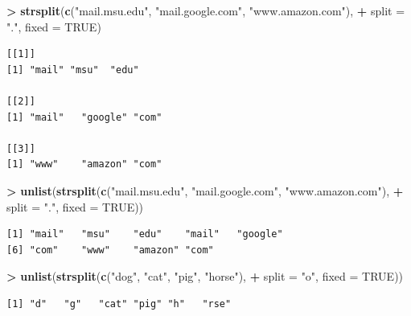 \documentclass[
]{krantz}
\makeatletter
\newenvironment{Shaded}{\begin{snugshade}}{\end{snugshade}}
\newcommand{\DataTypeTok}[1]{\textcolor[rgb]{0.27,0.27,0.27}{#1}}
\newcommand{\KeywordTok}[1]{\textcolor[rgb]{0.27,0.27,0.27}{\textbf{#1}}}
\newcommand{\NormalTok}[1]{#1}
\newcommand{\OperatorTok}[1]{\textcolor[rgb]{0.43,0.43,0.43}{\textbf{#1}}}
\newcommand{\OtherTok}[1]{\textcolor[rgb]{0.37,0.37,0.37}{#1}}
\newcommand{\StringTok}[1]{\textcolor[rgb]{0.5,0.5,0.5}{#1}}
\newenvironment{kframe}{%
\medskip{}
\setlength{\fboxsep}{.8em}
 \def\at@end@of@kframe{}%
 \ifinner\ifhmode%
  \def\at@end@of@kframe{\end{minipage}}%
  \begin{minipage}{\columnwidth}%
 \fi\fi%
 \def\FrameCommand##1{\hskip\@totalleftmargin \hskip-\fboxsep
 \colorbox{shadecolor}{##1}\hskip-\fboxsep
     \hskip-\linewidth \hskip-\@totalleftmargin \hskip\columnwidth}%
 \MakeFramed {\advance\hsize-\width
   \@totalleftmargin\z@ \linewidth\hsize
   \@setminipage}}%
 {\par\unskip\endMakeFramed%
 \at@end@of@kframe}
\renewenvironment{Shaded}{\begin{kframe}}{\end{kframe}}
\makeatother
\begin{document}
\begin{Shaded}
\begin{Highlighting}[]
\OperatorTok{\textgreater{}}\StringTok{ }\KeywordTok{strsplit}\NormalTok{(}\KeywordTok{c}\NormalTok{(}\StringTok{"mail.msu.edu"}\NormalTok{, }\StringTok{"mail.google.com"}\NormalTok{, }\StringTok{"www.amazon.com"}\NormalTok{),}
\OperatorTok{+}\StringTok{          }\DataTypeTok{split =} \StringTok{"."}\NormalTok{, }\DataTypeTok{fixed =} \OtherTok{TRUE}\NormalTok{)}
\end{Highlighting}
\end{Shaded}

\begin{verbatim}
[[1]]
[1] "mail" "msu"  "edu" 

[[2]]
[1] "mail"   "google" "com"   

[[3]]
[1] "www"    "amazon" "com"   
\end{verbatim}

\begin{Shaded}
\begin{Highlighting}[]
\OperatorTok{\textgreater{}}\StringTok{ }\KeywordTok{unlist}\NormalTok{(}\KeywordTok{strsplit}\NormalTok{(}\KeywordTok{c}\NormalTok{(}\StringTok{"mail.msu.edu"}\NormalTok{, }\StringTok{"mail.google.com"}\NormalTok{, }\StringTok{"www.amazon.com"}\NormalTok{),}
\OperatorTok{+}\StringTok{                 }\DataTypeTok{split =} \StringTok{"."}\NormalTok{, }\DataTypeTok{fixed =} \OtherTok{TRUE}\NormalTok{))}
\end{Highlighting}
\end{Shaded}

\begin{verbatim}
[1] "mail"   "msu"    "edu"    "mail"   "google"
[6] "com"    "www"    "amazon" "com"   
\end{verbatim}

\begin{Shaded}
\begin{Highlighting}[]
\OperatorTok{\textgreater{}}\StringTok{ }\KeywordTok{unlist}\NormalTok{(}\KeywordTok{strsplit}\NormalTok{(}\KeywordTok{c}\NormalTok{(}\StringTok{"dog"}\NormalTok{, }\StringTok{"cat"}\NormalTok{, }\StringTok{"pig"}\NormalTok{, }\StringTok{"horse"}\NormalTok{), }
\OperatorTok{+}\StringTok{                 }\DataTypeTok{split =} \StringTok{"o"}\NormalTok{, }\DataTypeTok{fixed =} \OtherTok{TRUE}\NormalTok{))}
\end{Highlighting}
\end{Shaded}

\begin{verbatim}
[1] "d"   "g"   "cat" "pig" "h"   "rse"
\end{verbatim}
\end{document}
